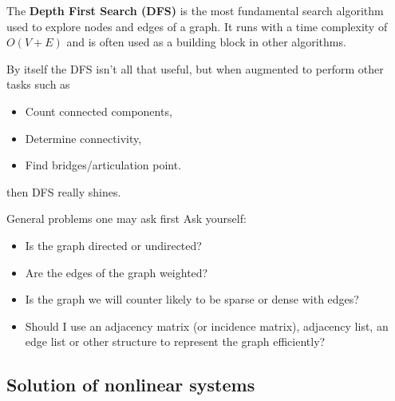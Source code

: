 \documentclass[xcolor=dvipsnames]{beamer}
\begin{document}
\begin{frame}
	The \textbf{Depth First Search (DFS)} is the most fundamental search algorithm used to explore nodes and edges of a 
	graph. It runs with a time complexity of $O(V+E)$ and is often used as a building block in other algorithms.

	By itself the DFS isn't all that useful, but when augmented to perform other tasks such as 
	\begin{itemize}
		\item Count connected components,
		\item Determine connectivity,
		\item Find bridges/articulation point.
	\end{itemize}
	then DFS really shines.
\end{frame}

\begin{frame}{General problems one may ask first}
Ask yourself:
	\begin{itemize}
		\item Is the graph directed or undirected?
		\item Are the edges of the graph weighted?
		\item Is the graph we will counter likely to be sparse or dense with edges?
		\item Should I use an adjacency matrix (or incidence matrix), adjacency list, an edge list or other structure to represent the graph efficiently?
	\end{itemize}
\end{frame}


\subsection{Solution of nonlinear systems}
\end{document}
